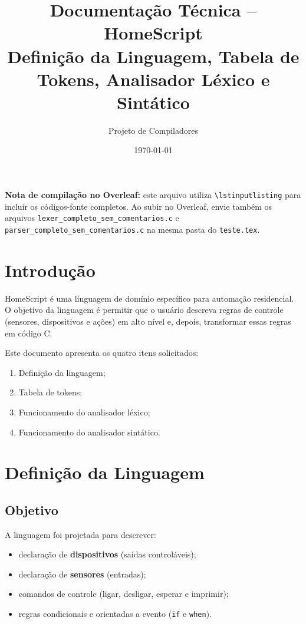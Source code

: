 \documentclass[12pt,a4paper]{article}
\title{Documentação Técnica -- HomeScript\\\large Definição da Linguagem, Tabela de Tokens, Analisador Léxico e Sintático}
\author{Projeto de Compiladores}
\date{\today}
\begin{document}
\maketitle
\tableofcontents
\newpage

\noindent\textbf{Nota de compilação no Overleaf:} este arquivo utiliza \texttt{\textbackslash lstinputlisting} para incluir os códigos-fonte completos. Ao subir no Overleaf, envie também os arquivos \texttt{lexer\_completo\_sem\_comentarios.c} e \texttt{parser\_completo\_sem\_comentarios.c} na mesma pasta do \texttt{teste.tex}.

\vspace{0.5cm}

\section{Introdução}
HomeScript é uma linguagem de domínio específico para automação residencial. O objetivo da linguagem é permitir que o usuário descreva regras de controle (sensores, dispositivos e ações) em alto nível e, depois, transformar essas regras em código C.

Este documento apresenta os quatro itens solicitados:
\begin{enumerate}[label=\arabic*.]
  \item Definição da linguagem;
  \item Tabela de tokens;
  \item Funcionamento do analisador léxico;
  \item Funcionamento do analisador sintático.
\end{enumerate}

\section{Definição da Linguagem}

\subsection{Objetivo}
A linguagem foi projetada para descrever:
\begin{itemize}
  \item declaração de \textbf{dispositivos} (saídas controláveis);
  \item declaração de \textbf{sensores} (entradas);
  \item comandos de controle (ligar, desligar, esperar e imprimir);
  \item regras condicionais e orientadas a evento (\texttt{if} e \texttt{when}).
\end{itemize}
\end{document}
